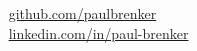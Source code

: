\documentclass{style/modernsimplecv}
\begin{document}
\begin{minipage}[t]{1\textwidth}
\begin{shaded*}
\begin{minipage}[t]{0.36\textwidth}

            \faGithub~ \protect\url{github.com/paulbrenker} \\
            \faLinkedin~ \protect\url{linkedin.com/in/paul-brenker} \\
        \end{minipage}
        \hfill
    \end{shaded*}
\end{minipage}\\[15pt]



\subsection*{}
\vspace{-3em}
\end{document}
